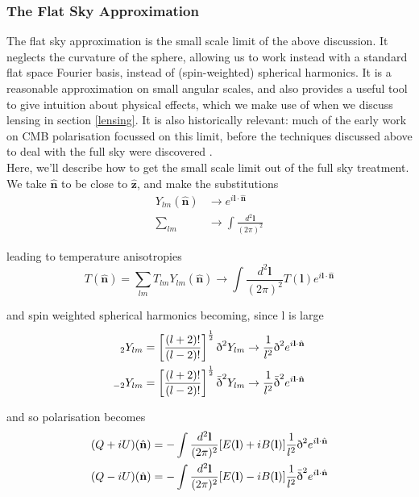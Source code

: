 \documentclass[a4paper,10pt]{article}
\renewcommand{\v}[1]{\mathbf{#1}}
\newcommand{\half}{\frac{1}{2}}
\newcommand{\finttwo}[1]{\int \frac{d^2 \v{#1}}{(2\pi)^2}}
\newcommand{\unit}[1]{\hat{\v{#1}}}
\newcommand{\sr}{\text{\normalfont\dh}}
\renewcommand{\sl}{\bar{\text{\normalfont\dh}}}
\newcommand{\ltwo}{\left[\frac{(l+2)!}{(l-2)!}\right]}
\begin{document}
\subsubsection{The Flat Sky Approximation}

The flat sky approximation is the small scale limit of the above discussion. It neglects the curvature of the sphere, allowing us to work instead with a standard flat space Fourier basis, instead of (spin-weighted) spherical harmonics. It is a reasonable approximation on small angular scales, and also provides a useful tool to give intuition about physical effects, which we make use of when we discuss lensing in section \ref{lensing}. It is also historically relevant: much of the early work on CMB polarisation focussed on this limit, before the techniques discussed above to deal with the full sky were discovered \cite{all-sky}.\\

Here, we'll describe how to get the small scale limit out of the full sky treatment.  We take $\unit{n}$ to be close to $\unit{z}$, and make the substitutions
\begin{equation}
\begin{split}
Y_{lm}(\unit{n}) &\rightarrow e^{i\v{l}\cdot\unit{n}}\\
\sum_{lm} &\rightarrow \finttwo{l}
\end{split}
\end{equation}

leading to temperature anisotropies
\begin{equation}
T(\unit{n}) = \sum_{lm} T_{lm}Y_{lm}(\unit{n})\rightarrow \finttwo{l} T(\v{l})e^{i\v{l}\cdot\unit{n}}
\end{equation}

and spin weighted spherical harmonics becoming, since l is large 
\begin{equation}\begin{split}
{}_2Y_{lm} &= \ltwo^\half\sr^2Y_{lm} \rightarrow \frac{1}{l^2}\sr^2e^{i\v{l}\cdot\unit{n}}\\
{}_{-2}Y_{lm} &= \ltwo^\half\sl^2Y_{lm} \rightarrow  \frac{1}{l^2}\sl^2e^{i\v{l}\cdot\unit{n}}
\end{split}\end{equation}

and so polarisation becomes
\begin{equation}\begin{split}
(Q+iU)(\unit{n}) &= -\finttwo{l} [E(\v{l})+iB(\v{l})]  \frac{1}{l^2}\sr^2e^{i\v{l}\cdot\unit{n}}\\
(Q-iU)(\unit{n}) &= -\finttwo{l} [E(\v{l})-iB(\v{l})] \frac{1}{l^2}\sl^2e^{i\v{l}\cdot\unit{n}}
\end{split}\end{equation}
\end{document}
